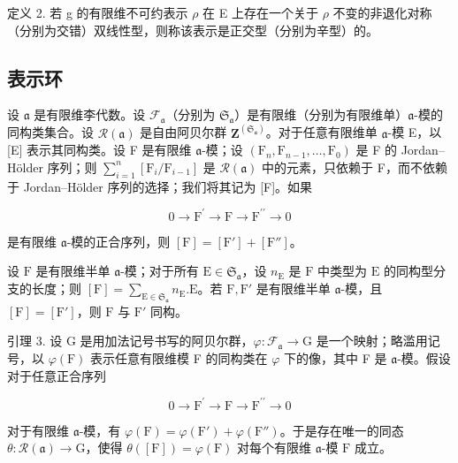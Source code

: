 定义 2. 若 g 的有限维不可约表示 \(\rho\) 在 E 上存在一个关于 \(\rho\) 不变的非退化对称（分别为交错）双线性型，则称该表示是正交型（分别为辛型）的。

\subsection{表示环}

设 \(\mathfrak{a}\) 是有限维李代数。设 \(\mathcal{F}_{\mathfrak{a}}\)（分别为 \(\mathfrak{S}_{\mathfrak{a}}\)）是有限维（分别为有限维单）\(\mathfrak{a}\)-模的同构类集合。设 \(\mathcal{R}(\mathfrak{a})\) 是自由阿贝尔群 \(\mathbf{Z}^{(\mathfrak{S}_{\mathfrak{a}})}\)。对于任意有限维单 \(\mathfrak{a}\)-模 E，以 {[}E{]} 表示其同构类。设 F 是有限维 \(\mathfrak{a}\)-模；设 \((\mathrm{F}_n,\mathrm{F}_{n - 1},\dots ,\mathrm{F}_0)\) 是 F 的 Jordan–Hölder 序列；则 \(\sum_{i = 1}^{n}[\mathrm{F}_i / \mathrm{F}_{i - 1}]\) 是 \(\mathcal{R}(\mathfrak{a})\) 中的元素，只依赖于 F，而不依赖于 Jordan–Hölder 序列的选择；我们将其记为 {[}F{]}。如果

\[
0 \longrightarrow \mathrm{F} ^ {\prime} \longrightarrow \mathrm{F} \longrightarrow \mathrm{F} ^ {\prime \prime} \longrightarrow 0
\]

是有限维 \(\mathfrak{a}\)-模的正合序列，则 \([\mathrm{F}] = [\mathrm{F}'] + [\mathrm{F}'']\)。

设 \(\mathrm{F}\) 是有限维半单 \(\mathfrak{a}\)-模；对于所有 \(\mathrm{E} \in \mathfrak{S}_{\mathfrak{a}}\)，设 \(n_{\mathrm{E}}\) 是 \(\mathrm{F}\) 中类型为 \(\mathrm{E}\) 的同构型分支的长度；则 \([\mathrm{F}] = \sum_{\mathrm{E} \in \mathfrak{S}_{\mathfrak{a}}} n_{\mathrm{E}}. \mathrm{E}\)。若 \(\mathrm{F}, \mathrm{F}'\) 是有限维半单 \(\mathfrak{a}\)-模，且 \([\mathrm{F}] = [\mathrm{F}']\)，则 \(\mathrm{F}\) 与 \(\mathrm{F}'\) 同构。

引理 3. 设 G 是用加法记号书写的阿贝尔群，\(\varphi : \mathcal{F}_{\mathfrak{a}} \to \mathrm{G}\) 是一个映射；略滥用记号，以 \(\varphi(\mathrm{F})\) 表示任意有限维模 F 的同构类在 \(\varphi\) 下的像，其中 F 是 \(\mathfrak{a}\)-模。假设对于任意正合序列

\[
0 \longrightarrow \mathrm{F} ^ {\prime} \longrightarrow \mathrm{F} \longrightarrow \mathrm{F} ^ {\prime \prime} \longrightarrow 0
\]

对于有限维 \(\mathfrak{a}\)-模，有 \(\varphi(\mathrm{F}) = \varphi(\mathrm{F}') + \varphi(\mathrm{F}'')\)。于是存在唯一的同态 \(\theta: \mathcal{R}(\mathfrak{a}) \to \mathrm{G}\)，使得 \(\theta([\mathrm{F}]) = \varphi(\mathrm{F})\) 对每个有限维 \(\mathfrak{a}\)-模 \(\mathrm{F}\) 成立。

